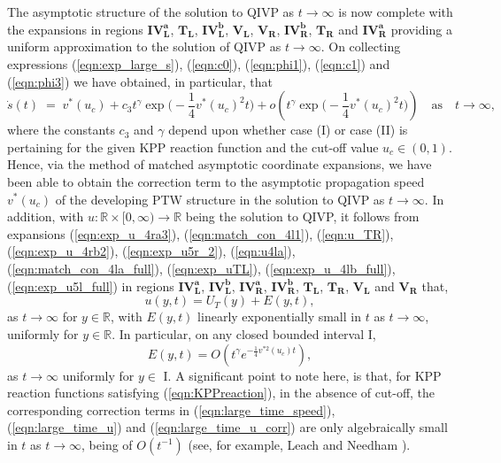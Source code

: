 \documentclass[11pt,a4paper]{article}
\newcommand{\eeref}[1]{(\ref{eqn:#1})}
\newcommand{\eelab}[1]{\label{eqn:#1}}
\def\beq{\begin{equation}}
\def\eeq{\end{equation}}
\begin{document}
The asymptotic structure of the solution to QIVP as $t \to \infty$ is now complete with the expansions in regions $\mathbf{IV_L^a}$, $\mathbf{T_L}$, $\mathbf{IV_L^b}$, $\mathbf{V_L}$, $\mathbf{V_R}$, $\mathbf{IV_R^b}$, $\mathbf{T_R}$ and $\mathbf{IV_R^a}$ providing a uniform approximation to the solution of QIVP as $t \to \infty$. On collecting expressions \eeref{exp_large_s}, \eeref{c0}, \eeref{phi1},  \eeref{c1} and \eeref{phi3} we have obtained, in particular, that 
\beq
\dot{s}(t) \; = \; v^*(u_c) + c_3 t^{\gamma}  \exp {  \bigg( - \frac{1}{4}  v^*(u_c)^2 t \bigg) }  + o \left( t^{\gamma}  \exp {  \bigg( - \frac{1}{4}  v^*(u_c)^2 t \bigg) }  \right) \quad \mbox{as} \quad t \to \infty,  \eelab{large_time_speed}
\eeq
where the constants $c_3$ and $\gamma$ depend upon whether case (I) or case (II) is pertaining for the given KPP reaction function and the cut-off value $u_c \in (0,1)$.
Hence, via the method of matched asymptotic coordinate expansions, we have been able to obtain the correction term to the asymptotic propagation speed $v^*(u_c)$ of the developing PTW structure in the solution to QIVP as $t \to \infty$.
 In addition, with $u : \mathbb{R} \times [ 0 , \infty) \to \mathbb{R}$ being the solution to QIVP, it follows from expansions \eeref{exp_u_4ra3}, \eeref{match_con_4l1}, \eeref{u_TR}, \eeref{exp_u_4rb2}, \eeref{exp_u5r_2},  
\eeref{u4la}, \eeref{match_con_4la_full}, \eeref{exp_uTL}, \eeref{exp_u_4lb_full}, \eeref{exp_u5l_full} in regions $\mathbf{IV_L^a}$, $\mathbf{IV_L^b}$, $\mathbf{IV_R^a}$, $\mathbf{IV_R^b}$, $\mathbf{T_L}$, $\mathbf{T_R}$, $\mathbf{V_L}$ and $\mathbf{V_R}$ that,
\beq \eelab{large_time_u}
u(y,t)=U_T(y) + E(y,t),
\eeq
as $t \to \infty$ for $y \in \mathbb{R}$, with $E(y,t)$ linearly exponentially small in 
$t$ as $t \to \infty$, uniformly for $y \in \mathbb{R}$. In particular, on any closed bounded interval I,
\beq \eelab{large_time_u_corr}
E(y,t) = O \left(  t^{\gamma} e^{- \frac{1}{4} v^{*2}(u_c) t}   \right), 
\eeq
as $t \to \infty$ uniformly for $y \in $ I. A significant point to note here, is that, for KPP reaction functions satisfying 
\eeref{KPPreaction}, in the absence of cut-off, the corresponding correction terms in \eeref{large_time_speed}, \eeref{large_time_u} and \eeref{large_time_u_corr} are only algebraically small in $t$ as $t \to \infty$, being of $O(t^{-1})$ (see, for example, Leach and Needham \cite{LeachNeedham2003}).
\end{document}
